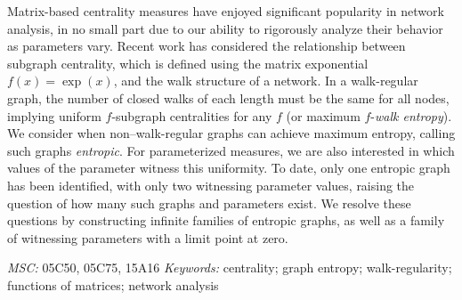 Matrix-based centrality measures have enjoyed significant popularity in network analysis, in
no small part due to our ability to rigorously analyze their behavior as parameters vary.
Recent work has considered the relationship between subgraph centrality,
which is defined using the matrix exponential $f(x) = \exp(x)$, and the walk structure of a network.
In a walk-regular graph, the number of closed walks of each length must be the same for all nodes, implying uniform $f$-subgraph centralities for any $f$ (or maximum $f$-\emph{walk entropy}).
We consider when non--walk-regular graphs can achieve maximum entropy, calling such graphs \emph{entropic}.
For parameterized measures, we are also interested in which values of the parameter witness this
uniformity.
To date, only one entropic graph has been identified, with only two witnessing parameter values, raising the question of how many such graphs and parameters exist.
We resolve these questions by constructing infinite families of entropic graphs, as well as a family of witnessing parameters with a limit point at zero.\newline

\noindent\textit{MSC:} 05C50, 05C75, 15A16 \newline
\noindent\textit{Keywords:} centrality; graph entropy; walk-regularity; functions of matrices; network analysis
